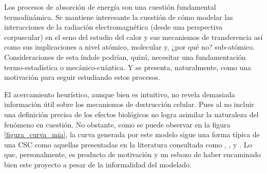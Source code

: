 \documentclass[12pt,letterpaper, oneside]{book}
\begin{document}
	Los procesos de absorción de energía son una cuestión fundamental termodinámica. Se mantiene interesante la cuestión de cómo modelar las interacciones de la radiación electromagnética (desde una perspectiva corpuscular) en el seno del estudio del calor y sus mecanismos de transferencia así como sus implicaciones a nivel atómico, molecular y, ¿por qué no? sub-atómico. Consideraciones de esta índole podrían, quizá, necesitar una fundamentación termo-estadística o mecánico-cuántica. Y se presenta, naturalmente, como una motivación para seguir estudiando estos procesos. 
	
	El acercamiento heurístico, aunque bien es intuitivo, no revela demasiada información útil sobre los mecanismos de destrucción celular. Pues al no incluir una definición precisa de los efectos biológicos no logra asimilar la naturaleza del fenómeno en cuestión. No obstante, como se puede observar en la figura \ref{figura_curva_mia}, la curva generada por este modelo sigue una forma típica de una CSC como aquellas presentadas en la literatura consultada como \cite{Bleehen.2007}, \cite{Hall.2000}, \cite{Mayles.2007} y  \cite{Tubiana.1990}. Lo que, personalmente, es producto de motivación y un esbozo de haber encaminado bien este proyecto a pesar de la informalidad del modelado. 	

	
	
	
\end{document}
